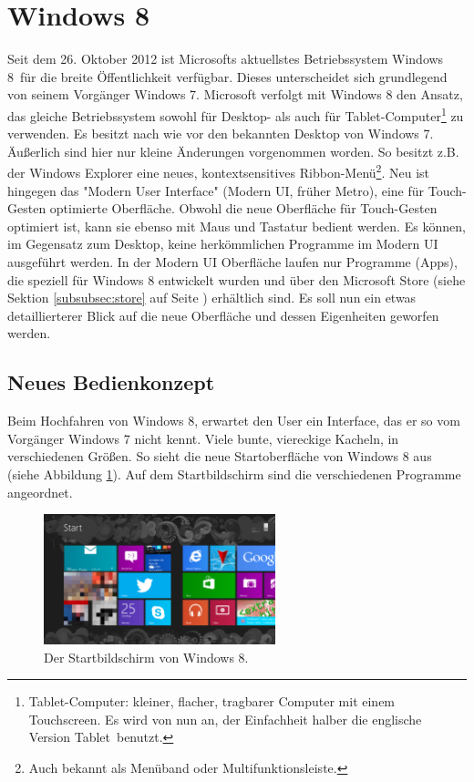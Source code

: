 \documentclass[12pt,a4paper,bibtotoc,abstracton]{scrartcl}
\begin{document}
\section{Windows 8}
\label{sec:windows8}
Seit dem 26. Oktober 2012 ist Microsofts aktuellstes Betriebssystem \glqq Windows 8\grqq\ für die breite Öffentlichkeit verfügbar. Dieses unterscheidet sich grundlegend von seinem Vorgänger \glqq Windows 7\grqq. Microsoft verfolgt mit Windows 8 den Ansatz, das gleiche Betriebssystem sowohl für Desktop- als auch für Tablet-Computer\footnote{Tablet-Computer: kleiner, flacher, tragbarer Computer mit einem Touchscreen. Es wird von nun an, der Einfachheit halber die englische Version \glqq Tablet\grqq\ benutzt.} zu verwenden. Es besitzt nach wie vor den bekannten Desktop von Windows 7. Äußerlich sind hier nur kleine Änderungen vorgenommen worden. So besitzt z.B. der Windows Explorer eine neues, kontextsensitives Ribbon-Menü\footnote{Auch bekannt als Menüband oder Multifunktionsleiste.}. Neu ist hingegen das "Modern User Interface" (Modern UI, früher Metro), eine für Touch-Gesten optimierte Oberfläche. Obwohl die neue Oberfläche für Touch-Gesten optimiert ist, kann sie ebenso mit Maus und Tastatur bedient werden. Es können, im Gegensatz zum Desktop, keine herkömmlichen Programme im Modern UI ausgeführt werden. In der Modern UI Oberfläche laufen nur Programme (Apps), die speziell für Windows 8 entwickelt wurden und über den Microsoft Store (siehe Sektion \ref{subsubsec:store} auf Seite \pageref{subsubsec:store}) erhältlich sind. Es soll nun ein etwas detaillierterer Blick auf die neue Oberfläche und dessen Eigenheiten geworfen werden.

\subsection{Neues Bedienkonzept}
\label{subsec:bedienkonzept}
Beim Hochfahren von Windows 8, erwartet den User ein Interface, das er so vom Vorgänger Windows 7 nicht kennt. Viele bunte, viereckige Kacheln, in verschiedenen Größen. So sieht die neue Startoberfläche von Windows 8 aus (siehe Abbildung \ref{fig:win8startscreen}). Auf dem Startbildschirm sind die verschiedenen Programme angeordnet.

\begin{figure}[h]	
	\centering
	\includegraphics[width=0.6\textwidth]{Bilder/Screenshots/windows8/win8_startscreen.png} 
	\caption{Der Startbildschirm von Windows 8.}
	\label{fig:win8startscreen}
\end{figure}
\end{document}
